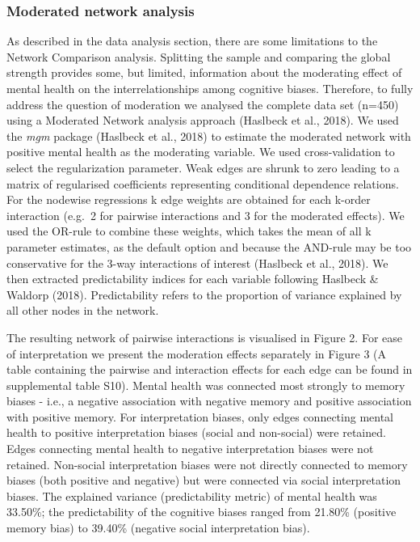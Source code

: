 \documentclass[
  english,
  man,floatsintext]{apa6}
\begin{document}
\hypertarget{moderated-network-analysis}{%
\subsubsection{Moderated network analysis}\label{moderated-network-analysis}}

As described in the data analysis section, there are some limitations to the Network Comparison analysis. Splitting the sample and comparing the global strength provides some, but limited, information about the moderating effect of mental health on the interrelationships among cognitive biases. Therefore, to fully address the question of moderation we analysed the complete data set (n=450) using a Moderated Network analysis approach (Haslbeck et al., 2018). We used the \emph{mgm} package (Haslbeck et al., 2018) to estimate the moderated network with positive mental health as the moderating variable. We used cross-validation to select the regularization parameter. Weak edges are shrunk to zero leading to a matrix of regularised coefficients representing conditional dependence relations. For the nodewise regressions k edge weights are obtained for each k-order interaction (e.g.~2 for pairwise interactions and 3 for the moderated effects). We used the OR-rule to combine these weights, which takes the mean of all k parameter estimates, as the default option and because the AND-rule may be too conservative for the 3-way interactions of interest (Haslbeck et al., 2018). We then extracted predictability indices for each variable following Haslbeck \& Waldorp (2018). Predictability refers to the proportion of variance explained by all other nodes in the network.

The resulting network of pairwise interactions is visualised in Figure 2. For ease of interpretation we present the moderation effects separately in Figure 3 (A table containing the pairwise and interaction effects for each edge can be found in supplemental table S10). Mental health was connected most strongly to memory biases - i.e., a negative association with negative memory and positive association with positive memory. For interpretation biases, only edges connecting mental health to positive interpretation biases (social and non-social) were retained. Edges connecting mental health to negative interpretation biases were not retained. Non-social interpretation biases were not directly connected to memory biases (both positive and negative) but were connected via social interpretation biases. The explained variance (predictability metric) of mental health was 33.50\%; the predictability of the cognitive biases ranged from 21.80\% (positive memory bias) to 39.40\% (negative social interpretation bias).
\end{document}
